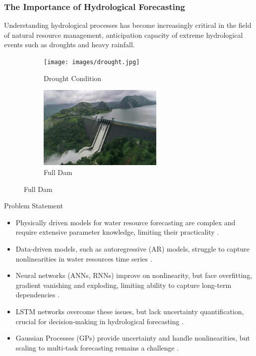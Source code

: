 \begin{frame}
	\frametitle{The Importance of Hydrological Forecasting}
	
	Understanding hydrological processes has become increasingly critical in the field of natural resource management, anticipation capacity of extreme hydrological events such as droughts and heavy rainfall.
	
	\begin{figure}
		\centering
		\begin{subfigure}[b]{0.45\textwidth}
			\centering
			\texttt{[image: images/drought.jpg]}
			\caption{Drought Condition}
		\end{subfigure}
		\hfill
		\begin{subfigure}[b]{0.45\textwidth}
			\centering
			\includegraphics[width=\textwidth, height=4cm]{images/full_dam.jpg}
			\caption{Full Dam}
		\end{subfigure}
	\end{figure}
	
\end{frame}

\begin{frame}{Problem Statement}
	\begin{itemize}
		\item Physically driven models for water resource forecasting are complex and require extensive parameter knowledge, limiting their practicality \cite{Yaseen2018, HKASHANI2016340}.
		\item Data-driven models, such as autoregressive (AR) models, struggle to capture nonlinearities in water resources time series \cite{10.2166/wst.2020.369}.
		\item Neural networks (ANNs, RNNs) improve on nonlinearity, but face overfitting, gradient vanishing and exploding, limiting ability to capture long-term dependencies \cite{Abdollahi2017, Shiau2016, KHAN2020125380}.
		\item LSTM networks overcome these issues, but lack uncertainty quantification, crucial for decision-making in hydrological forecasting \cite{lakshminarayanan2017simple, gal2016dropout}.
		\item Gaussian Processes (GPs) provide uncertainty and handle nonlinearities, but scaling to multi-task forecasting remains a challenge \cite{QUILTY2020104718, NIU2021102562,bruinsma2020scalable}.
	\end{itemize}
\end{frame}


